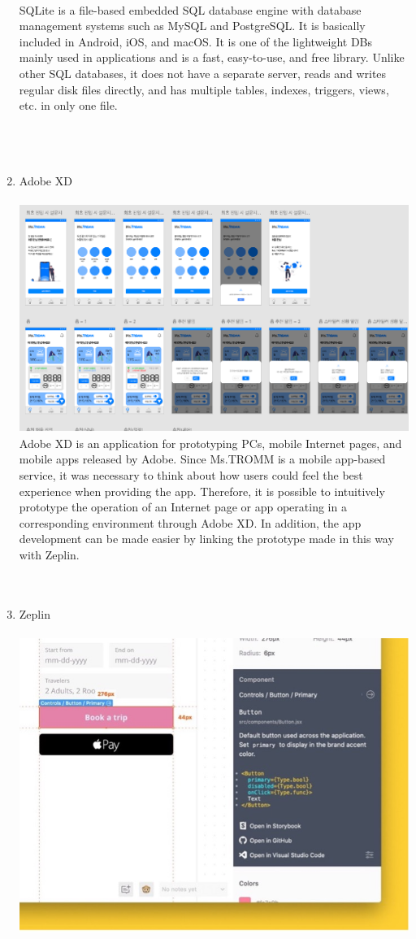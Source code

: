 \documentclass[conference]{IEEEtran}
\begin{document}
\begin{enumerate}
\\ SQLite is a file-based embedded SQL database engine with database management systems such as MySQL and PostgreSQL. It is basically included in Android, iOS, and macOS. It is one of the lightweight DBs mainly used in applications and is a fast, easy-to-use, and free library. Unlike other SQL databases, it does not have a separate server, reads and writes regular disk files directly, and has multiple tables, indexes, triggers, views, etc. in only one file.\\ \\ \\ \\
    \item Adobe XD \\ \\
\includegraphics[scale=0.9]{XD.png}
Adobe XD is an application for prototyping PCs, mobile Internet pages, and mobile apps released by Adobe. Since Ms.TROMM is a mobile app-based service, it was necessary to think about how users could feel the best experience when providing the app. Therefore, it is possible to intuitively prototype the operation of an Internet page or app operating in a corresponding environment through Adobe XD. In addition, the app development can be made easier by linking the prototype made in this way with Zeplin.\\ \\ \\
    \item Zeplin\\ \\
    \includegraphics[scale=0.32]{Zp.jpg}

\end{enumerate}
\end{document}
